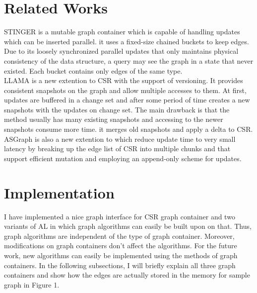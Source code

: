 \documentclass{article}
\begin{document}
\section{Related Works}
STINGER\cite{stinger} is a mutable graph container which is capable of handling updates which can be inserted parallel. it uses a fixed-size chained buckets to keep edges. Due to its loosely synchronized parallel updates that only maintains physical consistency of the data structure, a query may see the graph in a state that never existed. Each bucket contains only edges of the same type.\\
LLAMA\cite{llama} is a new extention to CSR with the support of versioning. It provides consistent snapshots on the graph and allow multiple accesses to them. At first, updates are buffered in a change set and after some period of time creates a new snapshots with the updates on change set. The main drawback is that the method usually has many existing snapshots and accessing to the newer snapshots consume more time. it merges old snapshots and apply a delta to CSR. \\
ASGraph\cite{asgraph} is also a new extention to which reduce update time to very small latency by breaking up the edge list of CSR into multiple chunks and that support efficient mutation and employing an append-only scheme for updates.
 
\section{Implementation}
 I have implemented a nice graph interface for CSR graph container and two variants of AL in which graph algorithms can easily be built upon on that. Thus, graph algorithms are independent of the type of graph container. Moreover, modifications on graph containers don't affect the algorithms. For the future work, new algorithms can easily be implemented using the methods of graph containers. In the following subsections, I will briefly explain all three graph containers and show how the edges are actually stored in the memory for sample graph in Figure 1.
\begin{center} 
 
\end{center}
\end{document}

